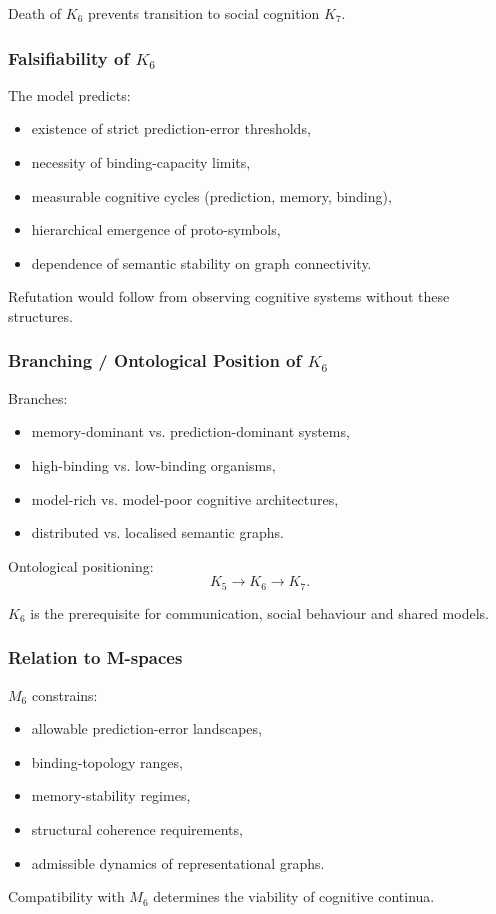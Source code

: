 Death of $K_6$ prevents transition to social cognition $K_7$.

\subsubsection{Falsifiability of \texorpdfstring{$K_6$}{K_6}}

The model predicts:
\begin{itemize}
    \item existence of strict prediction-error thresholds,
    \item necessity of binding-capacity limits,
    \item measurable cognitive cycles (prediction, memory, binding),
    \item hierarchical emergence of proto-symbols,
    \item dependence of semantic stability on graph connectivity.
\end{itemize}

Refutation would follow from observing cognitive systems without these structures.

\subsubsection{Branching / Ontological Position of \texorpdfstring{$K_6$}{K_6}}

Branches:
\begin{itemize}
    \item memory-dominant vs. prediction-dominant systems,
    \item high-binding vs. low-binding organisms,
    \item model-rich vs. model-poor cognitive architectures,
    \item distributed vs. localised semantic graphs.
\end{itemize}

Ontological positioning:
\[
K_5 \to K_6 \to K_7.
\]

$K_6$ is the prerequisite for communication, social behaviour and shared models.

\subsubsection{Relation to M-spaces}

$M_6$ constrains:
\begin{itemize}
    \item allowable prediction-error landscapes,
    \item binding-topology ranges,
    \item memory-stability regimes,
    \item structural coherence requirements,
    \item admissible dynamics of representational graphs.
\end{itemize}

Compatibility with $M_6$ determines the viability of cognitive continua.
